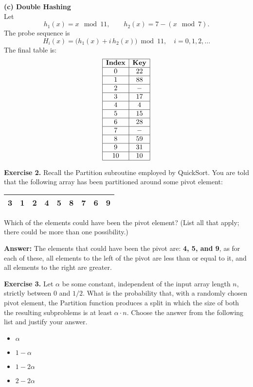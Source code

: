 \documentclass[11pt]{article}
\begin{document}
\textbf{(c) Double Hashing}\\[2mm]
Let 
\[
h_1(x)= x\mod 11,\qquad h_2(x)= 7 - \left(x\mod 7\right).
\]
The probe sequence is 
\[
H_i(x)=\bigl(h_1(x)+i\,h_2(x)\bigr) \bmod 11,\quad i=0,1,2,\dots
\]
The final table is:
\[
\begin{array}{|c|c|}
\hline
\textbf{Index} & \textbf{Key} \\ \hline
0  & 22 \\ \hline
1  & 88 \\ \hline
2  & \;-\; \\ \hline
3  & 17 \\ \hline
4  & 4  \\ \hline
5  & 15 \\ \hline
6  & 28 \\ \hline
7  & \;-\; \\ \hline
8  & 59 \\ \hline
9  & 31 \\ \hline
10 & 10 \\ \hline
\end{array}
\]



\textbf{Exercise 2.}  Recall the \textsf{Partition} subroutine employed by \textsf{QuickSort}. You are told that the following array has been partitioned around some pivot element:
\medskip

\begin{tabular}{|c|c|c|c|c|c|c|c|c|}
\hline 
3 & 1& 2 & 4 &5 &8 & 7 & 6 & 9 \\
\hline
\end{tabular}
\medskip

Which of the elements could have been the pivot element? (List all that apply; there could be more than one possibility.)
\medskip

\textbf{Answer:} The elements that could have been the pivot are: \textbf{4, 5, and 9}, as for each of these, all elements to the left of the pivot are less than or equal to it, and all elements to the right are greater.
\bigskip


\textbf{Exercise 3.}
Let $\alpha$ be some constant, independent of the input array length $n$, strictly between $0$ and $1/2$. What is the probability that, with a randomly chosen pivot element, the \textsf{Partition} function produces a split in which the size of both the resulting subproblems is at least $\alpha \cdot n$. Choose the answer from the following list and justify your answer.
\begin{itemize}
\item $\alpha$
\item $1 - \alpha$
\item $1-2\alpha$
\item $2 - 2 \alpha$
\end{itemize}
\medskip
\end{document}
